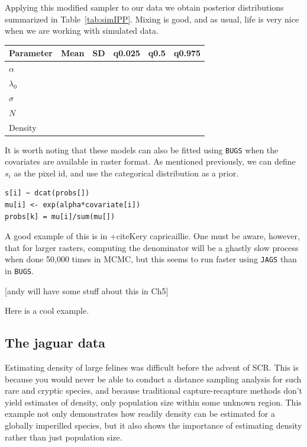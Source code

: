 Applying this modified sampler to our data we obtain posterior
distributions summarized in Table~\ref{tab:simIPP}. Mixing is good, and as usual,
life is very nice when we are working with simulated data.

\begin{table}
\centering
\begin{tabular}{lccccc}
Parameter & Mean & SD  & q0.025 & q0.5 & q0.975 \\
\hline
$\alpha$    &&&&& \\
$\lambda_0$  &&&&& \\
$\sigma$    &&&&& \\
$N$        &&&&& \\
Density     &&&&& \\
\hline
\end{tabular}
\label{ch9:tab:simIPP}
\end{table}

It is worth noting that these models can also be fitted using
\verb+BUGS+ when the covariates are available in raster format. As
mentioned previously, we can define $s_i$ as the pixel id, and use the
categorical distribution as a prior.

\begin{verbatim} 
s[i] ~ dcat(probs[])
mu[i] <- exp(alpha*covariate[i])
probs[k] = mu[i]/sum(mu[])
\end{verbatim}

A good example of this is in +cite{Kery capricaillie}. One must be
aware, however, that for larger rasters, computing the denominator
will be a ghastly slow process when done 50,000 times in MCMC, but
this seems to run faster using \verb+JAGS+ than in \verb+BUGS+. 

[andy will have some stuff about this in Ch5]

Here is a cool example.


\subsection{The jaguar data}

Estimating density of large felines was difficult before the advent of
SCR. This is because you would never be able to conduct a distance
sampling analysis for such rare and cryptic species, and because
traditional capture-recapture methods don't yield estimates of
density, only population size within some unknown region. This example
not only demonstrates how readily density can be estimated for a
globally imperilled species, but it also shows the importance of
estimating density rather than just population size. 

